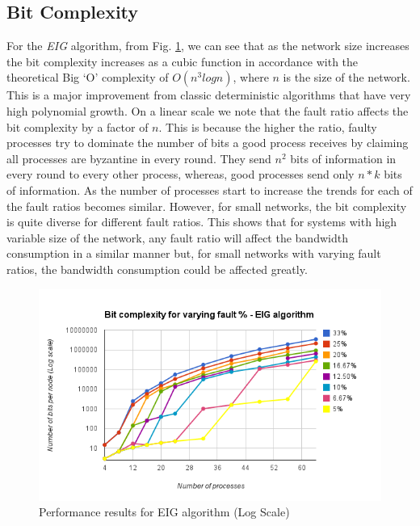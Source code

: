 \subsection{Bit Complexity}
For the \textit{EIG} algorithm, from Fig. \ref{fig:eig}, we can see that as the network size increases the bit complexity increases as a cubic function in accordance with the theoretical Big `O' complexity of $O(n^3 logn)$, where $n$ is the size of the network. This is a major improvement from classic deterministic algorithms that have very high polynomial growth. On a linear scale we note that the fault ratio affects the bit complexity by a factor of $n$. This is because the higher the ratio, faulty processes try to dominate the number of bits a good process receives by claiming all processes are byzantine in every round. They send $n^2$ bits of information in every round to every other process, whereas, good processes send only $n*k$ bits of information. As the number of processes start to increase the trends for each of the fault ratios becomes similar. However, for small networks, the bit complexity is quite diverse for different fault ratios. This shows that for systems with high variable size of the network, any fault ratio will affect the bandwidth consumption in a similar manner but, for small networks with varying fault ratios, the bandwidth consumption could be affected greatly.   
\begin{figure}[ht]
 \centering
\includegraphics[scale=0.4]{eig}
\caption{Performance results for EIG algorithm (Log Scale)}
 \label{fig:eig}
\end{figure}

